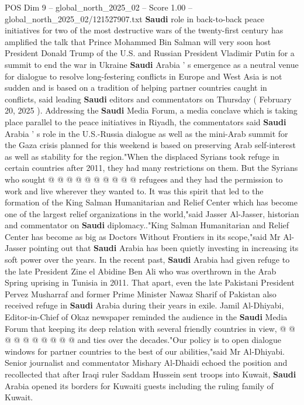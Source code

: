 \begin{textsample}{POS Dim 9 – global\_north\_2025\_02 – Score 1.00 – global\_north\_2025\_02/121527907.txt}  \label{ex:f9_pos_389}
\textbf{Saudi} role in back-to-back peace initiatives for two of the most destructive wars of the twenty-first century has amplified the talk that Prince Mohammed Bin Salman will very soon host President Donald Trump of the U.S. and Russian President Vladimir Putin for a summit to end the war in Ukraine \textbf{Saudi} Arabia ' s emergence as a neutral venue for dialogue to resolve long-festering conflicts in Europe and West Asia is not sudden and is based on a tradition of helping partner countries caught in conflicts, said leading \textbf{Saudi} editors and commentators on Thursday ( February 20, 2025 ).
Addressing the \textbf{Saudi} Media Forum, a media conclave which is taking place parallel to the peace initiatives in Riyadh, the commentators said \textbf{Saudi} Arabia ' s role in the U.S.-Russia dialogue as well as the mini-Arab summit for the Gaza crisis planned for this weekend is based on preserving Arab self-interest as well as stability for the region."When the displaced Syrians took refuge in certain countries after 2011, they had many restrictions on them.
But the Syrians who sought @ @ @ @ @ @ @ @ @ @ refugees and they had the permission to work and live wherever they wanted to.
It was this spirit that led to the formation of the King Salman Humanitarian and Relief Center which has become one of the largest relief organizations in the world,"said Jasser Al-Jasser, historian and commentator on \textbf{Saudi} diplomacy.."King Salman Humanitarian and Relief Center has become as big as Doctors Without Frontiers in its scope,"said Mr Al-Jasser pointing out that \textbf{Saudi} Arabia has been quietly investing in increasing its soft power over the years.
In the recent past, \textbf{Saudi} Arabia had given refuge to the late President Zine el Abidine Ben Ali who was overthrown in the Arab Spring uprising in Tunisia in 2011.
That apart, even the late Pakistani President Pervez Musharraf and former Prime Minister Nawaz Sharif of Pakistan also received refuge in \textbf{Saudi} Arabia during their years in exile.
Jamil Al-Dhiyabi, Editor-in-Chief of Okaz newspaper reminded the audience in the \textbf{Saudi} Media Forum that keeping its deep relation with several friendly countries in view, @ @ @ @ @ @ @ @ @ @ and ties over the decades."Our policy is to open dialogue windows for partner countries to the best of our abilities,"said Mr Al-Dhiyabi.
Senior journalist and commentator Mishary Al-Dhaidi echoed the position and recollected that after Iraqi ruler Saddam Hussein sent troops into Kuwait, \textbf{Saudi} Arabia opened its borders for Kuwaiti guests including the ruling family of Kuwait.

\end{textsample}
